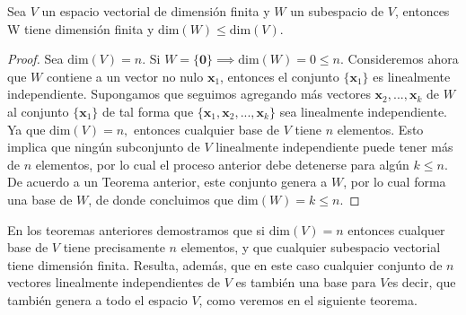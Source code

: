 \documentclass[notasLineal]{subfiles}
\begin{document}
\begin{Teo}\label{teo: Dimensión de subespacios de un espacio de dimensión finita}
    Sea $V$ un espacio vectorial de dimensión finita y $W$ un subespacio de $V$, entonces W tiene dimensión finita y $\text{dim}(W)\le \text{dim}(V).$ 
\begin{proof}

    Sea $\text{dim}(V)=n.$ Si $W=\{\mathbf{0}\} \implies \text{dim}(W)=0\le n.$ Consideremos ahora que $W$ contiene a un vector no nulo $\mathbf{x}_1$, entonces el conjunto $\{\mathbf{x}_1\}$ es linealmente independiente. Supongamos que seguimos agregando más vectores $\mathbf{x}_2,...,\mathbf{x}_k$ de $W$ al conjunto $\{\mathbf{x}_1\} $ de tal forma que $\{\mathbf{x}_1,\mathbf{x}_2,...,\mathbf{x}_k\}$ sea linealmente independiente. Ya que $\text{dim}(V)=n,$ entonces cualquier base de $V$ tiene $n$ elementos. Esto implica que ningún subconjunto de $V$ linealmente independiente puede tener más de $n$ elementos, por lo cual el proceso anterior debe detenerse para algún $k\le n.$ De acuerdo a un Teorema anterior, este conjunto genera a $W$, por lo cual forma una base de $W$, de donde concluimos que $\text{dim}(W)=k\le n.$

\end{proof}

\end{Teo}

En los teoremas anteriores demostramos que si $\text{dim}(V)=n$ entonces cualquer base de $V$ tiene precisamente $n$ elementos, y que cualquier subespacio vectorial tiene dimensión finita. Resulta, además, que en este caso cualquier conjunto de $n$ vectores linealmente independientes de $V$ es también una base para $V$\textemdash es decir, que también genera a todo el espacio $V$, como veremos en el siguiente teorema. 
\end{document}
